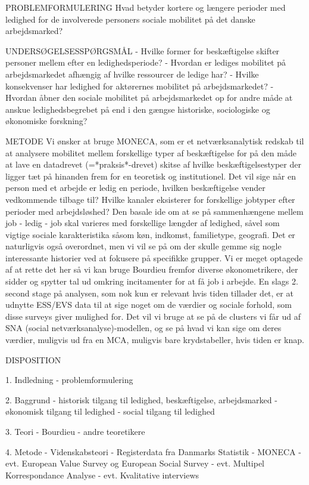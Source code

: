 PROBLEMFORMULERING
Hvad betyder kortere og længere perioder med ledighed for de involverede personers sociale mobilitet på det danske arbejdsmarked?

UNDERSØGELSESSPØRGSMÅL
- Hvilke former for beskæftigelse skifter personer mellem efter en ledighedsperiode?
- Hvordan er lediges mobilitet på arbejdsmarkedet afhængig af hvilke ressourcer de ledige har?
- Hvilke konsekvenser har ledighed for aktørernes mobilitet på arbejdsmarkedet?
- Hvordan åbner den sociale mobilitet på arbejdsmarkedet op for andre måde at anskue ledighedsbegrebet på end i den gængse historiske, sociologiske og økonomiske forskning?

METODE
Vi ønsker at bruge MONECA, som er et netværksanalytisk redskab til at analysere mobilitet mellem forskellige typer af beskæftigelse for på den måde at lave en datadrevet (=*praksis*-drevet) skitse af hvilke beskæftigelsestyper der ligger tæt på hinanden frem for en teoretisk og institutionel. Det vil sige når en person med et arbejde er ledig en periode, hvilken beskæftigelse vender vedkommende tilbage til? Hvilke kanaler eksisterer for forskellige jobtyper efter perioder med arbejdsløshed? 
Den basale ide om at se på sammenhængene mellem job - ledig - job skal varieres med forskellige længder af ledighed, såvel som vigtige sociale karakteristika såsom køn, indkomst, familietype, geografi. Det er naturligvis også overordnet, men vi vil se på om der skulle gemme sig nogle interessante historier ved at fokusere på specifikke grupper. Vi er meget optagede af at rette det her så vi kan bruge Bourdieu fremfor diverse økonometrikere, der sidder og spytter tal ud omkring incitamenter for at få job i arbejde. 
En slags 2. second stage på analysen, som nok kun er relevant hvis tiden tillader det, er at udnytte ESS/EVS data til at sige noget om de værdier og sociale forhold, som disse surveys giver mulighed for. Det vil vi bruge at se på de clusters vi får ud af SNA (social netværksanalyse)-modellen, og se på hvad vi kan sige om deres værdier, muligvis ud fra en MCA, muligvis bare krydstabeller, hvis tiden er knap.


DISPOSITION

1. Indledning
- problemformulering

2. Baggrund
- historisk tilgang til ledighed, beskæftigelse, arbejdsmarked
- økonomisk tilgang til ledighed
- social tilgang til ledighed

3. Teori
- Bourdieu
- andre teoretikere

4. Metode
- Videnskabsteori
- Registerdata fra Danmarks Statistik
- MONECA
- evt. European Value Survey og European Social Survey
- evt. Multipel Korrespondance Analyse
- evt. Kvalitative interviews

